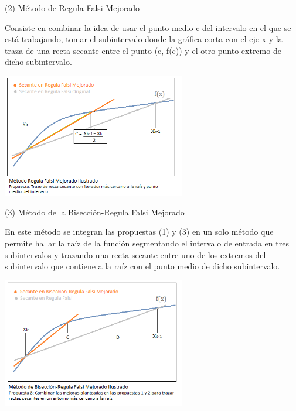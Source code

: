 \documentclass[11pt]{article}
\begin{document}
\vspace{0.5cm}
{\large (2) Método de Regula-Falsi Mejorado}

Consiste en combinar la idea de usar el punto medio c del intervalo en el que se está trabajando, tomar el subintervalo donde la gráfica corta con el eje x y la traza de una recta secante entre el punto (c, f(c)) y el otro punto extremo de dicho subintervalo.


\vspace{0.25cm}	
\begin{center}
\includegraphics[keepaspectratio, width=8cm]{P2.png}
\end{center}
\vspace{0.25cm}


\vspace{0.5cm}
{\large (3) Método de la Bisección-Regula Falsi Mejorado}

En este método se integran las propuestas (1) y (3) en un solo método que permite hallar la raíz de la función segmentando el intervalo de entrada en tres subintervalos y trazando una recta secante entre uno de los extremos del subintervalo que contiene a la raíz con el punto medio de dicho subintervalo.

\vspace{0.25cm}	
\begin{center}
\includegraphics[keepaspectratio, width=8cm]{P3.png}
\end{center}
\vspace{0.25cm}
\end{document}
